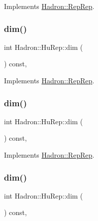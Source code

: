 Implements \mbox{\hyperlink{structHadron_1_1RepRep_a92c8802e5ed7afd7da43ccfd5b7cd92b}{Hadron\+::\+Rep\+Rep}}.

\mbox{\label{structHadron_1_1HuRep_aa222968e65bfc228eb9acf15a7df0388}} 
\subsubsection{\texorpdfstring{dim()}{dim()}\hspace{0.1cm}{\footnotesize\ttfamily [2/5]}}
{\footnotesize\ttfamily int Hadron\+::\+Hu\+Rep\+::dim (\begin{DoxyParamCaption}{ }\end{DoxyParamCaption}) const\hspace{0.3cm}{\ttfamily [inline]}, {\ttfamily [virtual]}}



Implements \mbox{\hyperlink{structHadron_1_1RepRep_a92c8802e5ed7afd7da43ccfd5b7cd92b}{Hadron\+::\+Rep\+Rep}}.

\mbox{\label{structHadron_1_1HuRep_aa222968e65bfc228eb9acf15a7df0388}} 
\subsubsection{\texorpdfstring{dim()}{dim()}\hspace{0.1cm}{\footnotesize\ttfamily [3/5]}}
{\footnotesize\ttfamily int Hadron\+::\+Hu\+Rep\+::dim (\begin{DoxyParamCaption}{ }\end{DoxyParamCaption}) const\hspace{0.3cm}{\ttfamily [inline]}, {\ttfamily [virtual]}}



Implements \mbox{\hyperlink{structHadron_1_1RepRep_a92c8802e5ed7afd7da43ccfd5b7cd92b}{Hadron\+::\+Rep\+Rep}}.

\mbox{\label{structHadron_1_1HuRep_aa222968e65bfc228eb9acf15a7df0388}} 
\subsubsection{\texorpdfstring{dim()}{dim()}\hspace{0.1cm}{\footnotesize\ttfamily [4/5]}}
{\footnotesize\ttfamily int Hadron\+::\+Hu\+Rep\+::dim (\begin{DoxyParamCaption}{ }\end{DoxyParamCaption}) const\hspace{0.3cm}{\ttfamily [inline]}, {\ttfamily [virtual]}}



